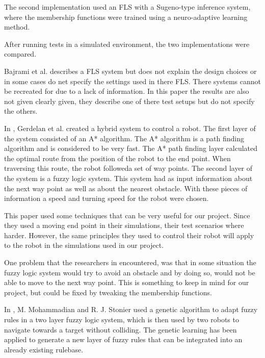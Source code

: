 \documentclass[conference]{IEEEtran}
\begin{document}
The second implementation used an FLS with a Sugeno-type inference system, where the membership functions were trained using a neuro-adaptive learning method.

After running tests in a simulated environment, the two implementations were compared.

Bajrami et al. \cite{bajrami2015artificial} describes a FLS system but does not explain the design choices or in some cases do net specify the settings used in there FLS. There systems cannot be recreated for due to a lack of information. In this paper the results are also not given clearly given, they describe one of there test setups but do not specify the others.

In \cite{gerdelan2006novel}, Gerdelan et al. created a hybrid system to control a robot. The first layer of the system consisted of an A* algorithm. The A* algorithm is a path finding algorithm and is considered to be very fast. The A* path finding layer calculated the optimal route from the position of the robot to the end point. When traversing this route, the robot followeda set of way points. The second layer of the system is a fuzzy logic system. This system had as input information about the next way point as well as about the nearest obstacle. With these pieces of information a speed and turning speed for the robot were chosen.

This paper used some techniques that can be very useful for our project. Since they used a moving end point in their simulations, their test scenarios where harder. However, the same principles they used to control their robot will apply to the robot in the simulations used in our project.

One problem that the researchers in \cite{gerdelan2006novel} encountered, was that in some situation the fuzzy logic system would try to avoid an obstacle and by doing so, would not be able to move to the next way point. This is something to keep in mind for our project, but could be fixed by tweaking the membership functions.

In \cite{mohammadian1995adaptive}, M. Mohammadian and R. J. Stonier used a genetic algorithm to adapt fuzzy rules in a two layer fuzzy logic system, which is then used by two robots to navigate towards a target without colliding.
The genetic learning has been applied to generate a new layer of fuzzy rules that can be integrated into an already existing rulebase.
\end{document}

